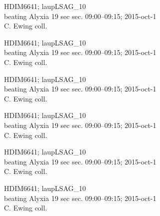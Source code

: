 \documentclass[2pt]{extarticle}
\begin{document}
\noindent
\parbox{0.16\textwidth}{\tiny \raggedright \rule[-0.3\baselineskip]{0pt}{10pt}HDIM6641; laupLSAG\_10\\ beating Alyxia 19 sec sec. 09:00--09:15; 2015-oct-1\\ C. Ewing coll.}
\parbox{0.16\textwidth}{\tiny \raggedright \rule[-0.3\baselineskip]{0pt}{10pt}HDIM6641; laupLSAG\_10\\ beating Alyxia 19 sec sec. 09:00--09:15; 2015-oct-1\\ C. Ewing coll.}
\parbox{0.16\textwidth}{\tiny \raggedright \rule[-0.3\baselineskip]{0pt}{10pt}HDIM6641; laupLSAG\_10\\ beating Alyxia 19 sec sec. 09:00--09:15; 2015-oct-1\\ C. Ewing coll.}
\parbox{0.16\textwidth}{\tiny \raggedright \rule[-0.3\baselineskip]{0pt}{10pt}HDIM6641; laupLSAG\_10\\ beating Alyxia 19 sec sec. 09:00--09:15; 2015-oct-1\\ C. Ewing coll.}
\parbox{0.16\textwidth}{\tiny \raggedright \rule[-0.3\baselineskip]{0pt}{10pt}HDIM6641; laupLSAG\_10\\ beating Alyxia 19 sec sec. 09:00--09:15; 2015-oct-1\\ C. Ewing coll.}
\parbox{0.16\textwidth}{\tiny \raggedright \rule[-0.3\baselineskip]{0pt}{10pt}HDIM6641; laupLSAG\_10\\ beating Alyxia 19 sec sec. 09:00--09:15; 2015-oct-1\\ C. Ewing coll.} \\ 
\vspace{0.001in} 
\end{document}
